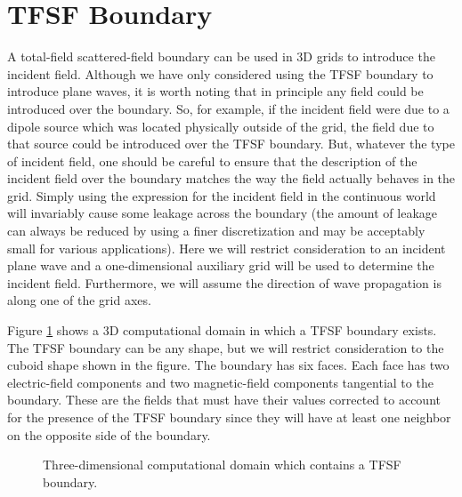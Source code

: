 \section{TFSF Boundary}

A total-field scattered-field boundary can be used in 3D grids to
introduce the incident field.  Although we have only considered using
the TFSF boundary to introduce plane waves, it is worth noting that in
principle any field could be introduced over the boundary.  So, for
example, if the incident field were due to a dipole source which was
located physically outside of the grid, the field due to that source
could be introduced over the TFSF boundary.  But, whatever the type of
incident field, one should be careful to ensure that the description of
the incident field over the boundary matches the way the field
actually behaves in the grid.  Simply using the expression for the
incident field in the continuous world will invariably cause some
leakage across the boundary (the amount of leakage can always be
reduced by using a finer discretization and may be acceptably small
for various applications).  Here we will restrict consideration to an
incident plane wave and a one-dimensional auxiliary grid will be used
to determine the incident field.  Furthermore, we will assume the
direction of wave propagation is along one of the grid axes.

Figure \ref{fig:3dTfsfBoundary} shows a 3D computational domain in
which a TFSF boundary exists.  The TFSF boundary can be any shape, but
we will restrict consideration to the cuboid shape shown in the
figure.  The boundary has six faces.  Each face has two electric-field
components and two magnetic-field components tangential to the
boundary.  These are the fields that must have their values corrected
to account for the presence of the TFSF boundary since they will have
at least one neighbor on the opposite side of the boundary.

\begin{figure}
  \begin{center}
  \end{center} 
  \caption{Three-dimensional computational domain which contains a
  TFSF boundary.}  \label{fig:3dTfsfBoundary}
\end{figure}

